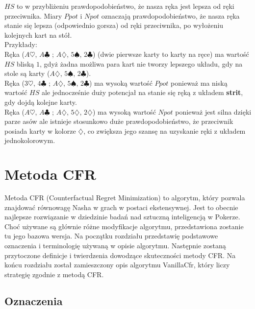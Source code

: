 \documentclass[licencjacka]{pracamgr}
\begin{document}
\noindent
$HS$ to w przybliżeniu prawdopodobieństwo, że nasza ręka jest lepsza od ręki przeciwnika. Miary $Ppot$ i $Npot$ oznaczają
prawdopodobieństwo, że nasza ręka stanie się lepsza (odpowiednio gorsza) od ręki przeciwnika, po wyłożeniu kolejnych kart na stół. \\

\noindent
Przykłady: \\

\noindent
Ręka ($A\heartsuit$, $A\clubsuit$ ; $A\diamondsuit$, $5\spadesuit$, $2\clubsuit$) (dwie pierwsze karty to karty na ręce) ma wartość $HS$
bliską $1$, gdyż żadna możliwa para kart nie tworzy lepszego układu, gdy na stole są karty ($A\diamondsuit$, $5\spadesuit$, $2\clubsuit$). \\

\noindent
Ręka ($3\heartsuit$, $4\clubsuit$ ; $A\diamondsuit$, $5\spadesuit$, $2\clubsuit$) ma wysoką wartość $Ppot$ ponieważ ma niską wartość $HS$
ale jednocześnie duży potencjał na stanie się ręką z układem \textbf{strit}, gdy dojdą kolejne karty. \\

\noindent
Ręka ($A\heartsuit$, $A\clubsuit$ ; $A\diamondsuit$, $5\diamondsuit$, $2\diamondsuit$) ma wysoką wartość $Npot$ ponieważ jest silna
dzięki parze asów ale istnieje stosunkowo duże prawdopodobieństwo, że przeciwnik posiada karty w kolorze $\diamondsuit$, co zwiększa jego szansę
na uzyskanie ręki z układem jednokolorowym.


\chapter{Metoda CFR}

Metoda CFR (Counterfactual Regret Minimization) to algorytm, który pozwala znajdować równowagę Nasha
w grach w postaci ekstensywnej. Jest to obecnie najlepsze rozwiązanie w dziedzinie badań nad
sztuczną inteligencją w Pokerze. Choć używane są głównie różne modyfikacje algorytmu,
przedstawiona zostanie tu jego bazowa wersja. Na początku rozdziału przedstawię podstawowe oznaczenia i terminologię
używaną w opisie algorytmu. Następnie zostaną przytoczone definicje i twierdzenia dowodzące skuteczności metody
CFR. Na końcu rozdziału został zamieszczony opis algorytmu VanillaCfr, który liczy strategię zgodnie z metodą CFR.

\section{Oznaczenia}
\end{document}
